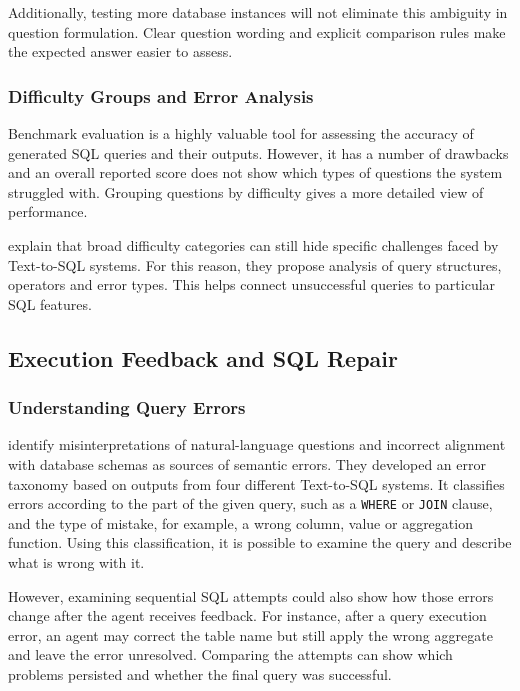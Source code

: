 Additionally, testing more database instances 
will not eliminate this ambiguity in question formulation.
Clear question wording and explicit comparison rules make the expected
answer easier to assess.

\subsubsection{Difficulty Groups and Error Analysis}

Benchmark evaluation is a highly valuable tool for assessing 
the accuracy of generated SQL queries and their outputs.
However, it has a number of drawbacks and an overall reported score 
does not show which types of questions the system struggled with.
Grouping questions by difficulty gives a more detailed view of performance.

\citet{mitsopoulou2025analysis} explain that broad difficulty categories
can still hide specific challenges faced by Text-to-SQL systems.
For this reason, they propose analysis of query structures, operators and error types.
This helps connect unsuccessful queries to particular SQL features.

\subsection{Execution Feedback and SQL Repair}
\label{sec:literature-repair}

\subsubsection{Understanding Query Errors}

\citet{ning2024insights} identify misinterpretations of natural-language questions 
and incorrect alignment with database schemas as sources of semantic errors. 
They developed an error taxonomy based on outputs from four different Text-to-SQL systems. 
It classifies errors according to the part of the given query, 
such as a \texttt{WHERE} or \texttt{JOIN} clause, 
and the type of mistake, for example, a wrong column, value or aggregation function. 
Using this classification, it is possible to examine the query and describe what is wrong with it.

However, examining sequential SQL attempts could also show 
how those errors change after the agent receives feedback. 
For instance, after a query execution error, 
an agent may correct the table name but still apply the wrong aggregate and leave the error unresolved. 
Comparing the attempts can show which problems persisted and whether the final query was successful.

